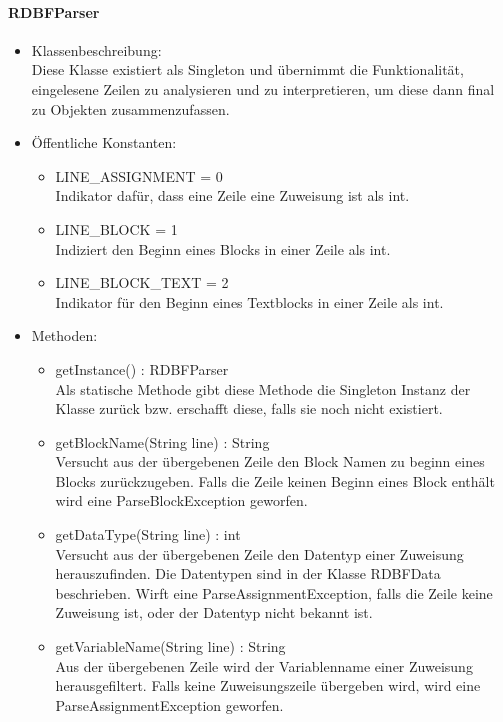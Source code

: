 \documentclass[parskip=full]{scrartcl}
\begin{document}
\paragraph{RDBFParser}
\begin{itemize}
\item Klassenbeschreibung: \\
Diese Klasse existiert als Singleton und übernimmt die Funktionalität, eingelesene Zeilen zu analysieren und zu interpretieren, um diese dann final zu Objekten zusammenzufassen.
\item Öffentliche Konstanten: \\
\begin{itemize}
\item LINE\_ASSIGNMENT = 0 \\
Indikator dafür, dass eine Zeile eine Zuweisung ist als int.
\item LINE\_BLOCK = 1 \\
Indiziert den Beginn eines Blocks in einer Zeile als int.
\item LINE\_BLOCK\_TEXT = 2 \\
Indikator für den Beginn eines Textblocks in einer Zeile als int.
\end{itemize}
\item Methoden: \\
\begin{itemize}
\item getInstance() : RDBFParser \\
Als statische Methode gibt diese Methode die Singleton Instanz der Klasse zurück bzw. erschafft diese, falls sie noch nicht existiert.
\item getBlockName(String line) : String \\
Versucht aus der übergebenen Zeile den Block Namen zu beginn eines Blocks zurückzugeben.
Falls die Zeile keinen Beginn eines Block enthält wird eine ParseBlockException geworfen.
\item getDataType(String line) : int \\
Versucht aus der übergebenen Zeile den Datentyp einer Zuweisung herauszufinden.
Die Datentypen sind in der Klasse RDBFData beschrieben.
Wirft eine ParseAssignmentException, falls die Zeile keine Zuweisung ist, oder der Datentyp nicht bekannt ist.
\item getVariableName(String line) : String \\
Aus der übergebenen Zeile wird der Variablenname einer Zuweisung herausgefiltert.
Falls keine Zuweisungszeile übergeben wird, wird eine ParseAssignmentException geworfen.

\end{itemize}
\end{itemize}
\end{document}
